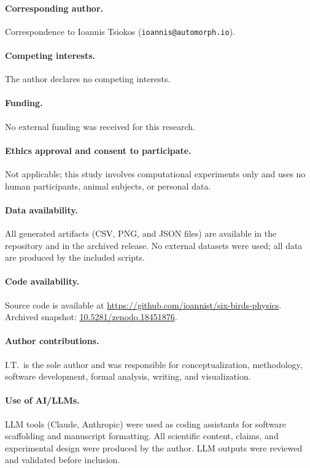 \documentclass[11pt]{article}
\begin{document}
\paragraph{Corresponding author.}
Correspondence to Ioannis Tsiokos (\texttt{ioannis@automorph.io}).

\paragraph{Competing interests.}
The author declares no competing interests.

\paragraph{Funding.}
No external funding was received for this research.

\paragraph{Ethics approval and consent to participate.}
Not applicable; this study involves computational experiments only and uses no human participants, animal subjects, or personal data.

\paragraph{Data availability.}
All generated artifacts (CSV, PNG, and JSON files) are available in the repository and in the archived release. No external datasets were used; all data are produced by the included scripts.

\paragraph{Code availability.}
Source code is available at \url{https://github.com/ioannist/six-birds-physics}.
Archived snapshot: \href{https://doi.org/10.5281/zenodo.18451876}{10.5281/zenodo.18451876}.

\paragraph{Author contributions.}
I.T.\ is the sole author and was responsible for conceptualization, methodology, software development, formal analysis, writing, and visualization.

\paragraph{Use of AI/LLMs.}
LLM tools (Claude, Anthropic) were used as coding assistants for software scaffolding and manuscript formatting. All scientific content, claims, and experimental design were produced by the author. LLM outputs were reviewed and validated before inclusion.
\end{document}
